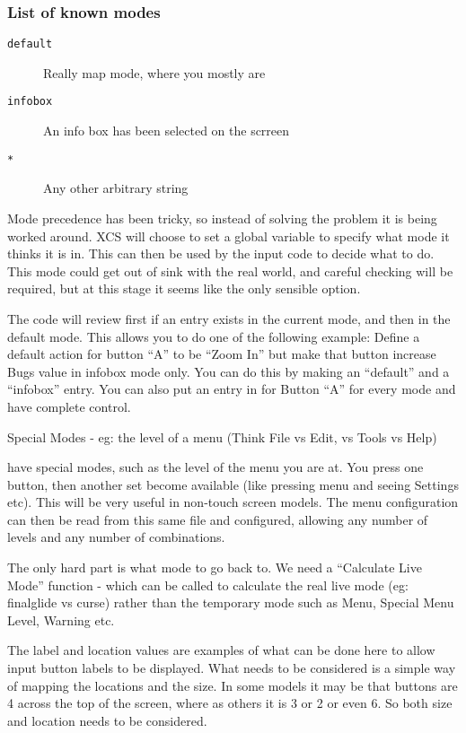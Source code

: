 \subsubsection{List of known modes}

\begin{description}
\item[\texttt{default}] Really map mode, where you mostly are
\item[\texttt{infobox}] An info box has been selected on the scrreen
\item[\texttt{*}] Any other arbitrary string
\end{description}

Mode precedence has been tricky, so instead of solving the problem 
it is being worked around. XCS will choose to set a global variable 
to specify what mode it thinks it is in. This can then be used by the
input code to decide what to do. This mode could get out of sink
with the real world, and careful checking will be required, but at
this stage it seems like the only sensible option.

The code will review first if an entry exists in the current mode, and 
then in the default mode. This allows you to do one of the following
example: Define a default action for button ``A'' to be ``Zoom In'' but
make that button increase Bugs value in infobox mode only. You can do
this by making an ``default'' and a ``infobox'' entry. You can also put an entry
in for Button ``A'' for every mode and have complete control.

Special Modes - eg: the level of a menu (Think File vs Edit, vs Tools vs Help)

have special modes, such as
the level of the menu you are at. You press one button, then another
set become available (like pressing menu and seeing Settings etc). This
will be very useful in non-touch screen models. The menu configuration
can then be read from this same file and configured, allowing any
number of levels and any number of combinations.

The only hard part is what mode to go back to. We need a 
``Calculate Live Mode'' function - which can be called to calculate the
real live mode (eg: finalglide vs curse) rather than the temporary
mode such as Menu, Special Menu Level, Warning etc.

The label and location values are examples of what can be done here
to allow input button labels to be displayed. What needs to be 
considered is a simple way of mapping the locations and the size.
In some models it may be that buttons are 4 across the top of the
screen, where as others it is 3 or 2 or even 6. So both size and
location needs to be considered.

